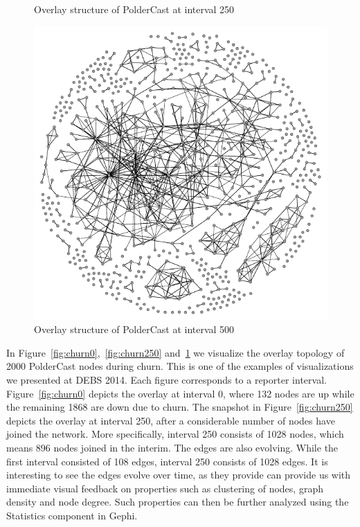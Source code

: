 \begin{figure}[H]
    \caption{Overlay structure  of PolderCast at interval 250}
    \label{fig:churn250}
    \includegraphics[scale=0.85]{figures/churn_500}
    \caption{Overlay structure of PolderCast at interval 500}
    \label{fig:churn500}
\end{figure}

In Figure~\ref{fig:churn0},~\ref{fig:churn250} and~\ref{fig:churn500} we
visualize the overlay topology of 2000 PolderCast nodes during churn.
This is one of the examples of visualizations we presented at DEBS 2014.
Each figure corresponds to a reporter interval. Figure~\ref{fig:churn0}
depicts the overlay at interval 0, where 132 nodes are up while the
remaining 1868 are down due to churn. The snapshot in
Figure~\ref{fig:churn250} depicts the overlay at interval 250, after a
considerable number of nodes have joined the network. More specifically,
interval 250 consists of 1028 nodes, which means 896 nodes joined in the
interim. The edges are also evolving. While the first interval consisted
of 108 edges, interval 250 consists of 1028 edges. It is interesting to
see the edges evolve over time, as they provide can provide us with
immediate visual feedback on properties such as clustering of nodes,
graph density and node degree. Such properties can then be further
analyzed using the Statistics component in Gephi.

